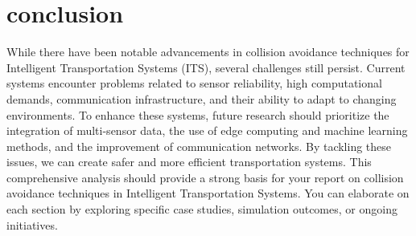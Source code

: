 \documentclass[12pt,twocolumn]{article}
\begin{document}
\section{conclusion}
While there have been notable advancements in collision avoidance techniques for Intelligent Transportation Systems (ITS), several challenges still persist. Current systems encounter problems related to sensor reliability, high computational demands, communication infrastructure, and their ability to adapt to changing environments. To enhance these systems, future research should prioritize the integration of multi-sensor data, the use of edge computing and machine learning methods, and the improvement of communication networks. By tackling these issues, we can create safer and more efficient transportation systems. This comprehensive analysis should provide a strong basis for your report on collision avoidance techniques in Intelligent Transportation Systems. You can elaborate on each section by exploring specific case studies, simulation outcomes, or ongoing initiatives.

 
\end{document}
